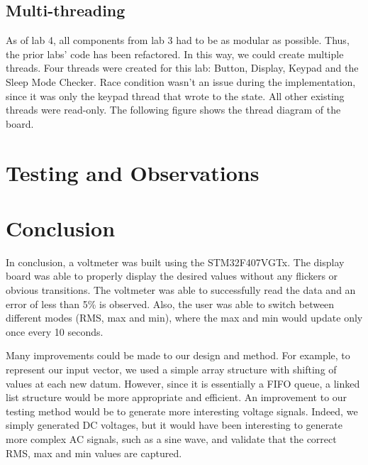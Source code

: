 \documentclass[a4paper,titlepage]{article}
\begin{document}
\subsection{Multi-threading}
As of lab 4, all components from lab 3 had to be as modular as possible. Thus, the prior labs' code has been refactored. In this way, we could create multiple threads. Four threads were created for this lab: Button, Display, Keypad and the Sleep Mode Checker. Race condition wasn't an issue during the implementation, since it was only the keypad thread that wrote to the state. All other existing threads were read-only.  The following figure shows the thread diagram of the board.


\section{Testing and Observations}

\section{Conclusion}
In conclusion, a voltmeter was built using the STM32F407VGTx. The display board was able to properly display the desired values without any flickers or obvious transitions. The voltmeter was able to successfully read the data and an error of less than 5\% is observed. Also, the user was able to switch between different modes (RMS, max and min), where the max and min would update only once every 10 seconds.

Many improvements could be made to our design and method. For example, to represent our input vector, we used a simple array structure with shifting of values at each new datum. However, since it is essentially a FIFO queue, a linked list structure would be more appropriate and efficient. An improvement to our testing method would be to generate more interesting voltage signals. Indeed, we simply generated DC voltages, but it would have been interesting to generate more complex AC signals, such as a sine wave, and validate that the correct RMS, max and min values are captured.


\end{document}
